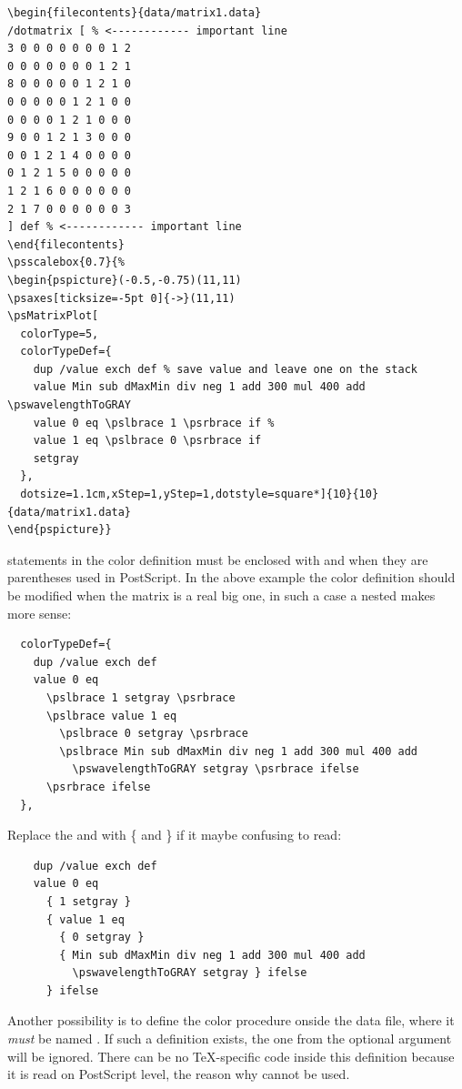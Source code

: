 \documentclass[11pt,english,BCOR=10mm,DIV=12,bibliography=totoc,parskip=false,headings=small,
    headinclude=false,footinclude=false,oneside]{pst-doc}
\begin{document}
\begin{lstlisting}
\begin{filecontents}{data/matrix1.data}
/dotmatrix [ % <------------ important line
3 0 0 0 0 0 0 0 1 2
0 0 0 0 0 0 0 1 2 1
8 0 0 0 0 0 1 2 1 0
0 0 0 0 0 1 2 1 0 0
0 0 0 0 1 2 1 0 0 0
9 0 0 1 2 1 3 0 0 0
0 0 1 2 1 4 0 0 0 0
0 1 2 1 5 0 0 0 0 0
1 2 1 6 0 0 0 0 0 0
2 1 7 0 0 0 0 0 0 3
] def % <------------ important line
\end{filecontents}
\psscalebox{0.7}{%
\begin{pspicture}(-0.5,-0.75)(11,11)
\psaxes[ticksize=-5pt 0]{->}(11,11)
\psMatrixPlot[
  colorType=5,
  colorTypeDef={
    dup /value exch def % save value and leave one on the stack
    value Min sub dMaxMin div neg 1 add 300 mul 400 add \pswavelengthToGRAY 
    value 0 eq \pslbrace 1 \psrbrace if % 
    value 1 eq \pslbrace 0 \psrbrace if  
    setgray 
  },
  dotsize=1.1cm,xStep=1,yStep=1,dotstyle=square*]{10}{10}{data/matrix1.data}
\end{pspicture}}
\end{lstlisting}


 statements in the color definition must be enclosed with  and 
when they are parentheses used in PostScript. In the above example the color definition should be
modified when the matrix is a real big one, in such a case a nested  makes more sense:

\begin{lstlisting}
  colorTypeDef={
    dup /value exch def 
    value 0 eq 
      \pslbrace 1 setgray \psrbrace
      \pslbrace value 1 eq 
        \pslbrace 0 setgray \psrbrace
        \pslbrace Min sub dMaxMin div neg 1 add 300 mul 400 add
          \pswavelengthToGRAY setgray \psrbrace ifelse
      \psrbrace ifelse 
  },
\end{lstlisting}

Replace the  and  with \{ and \} if it maybe confusing to read:

\begin{lstlisting}
    dup /value exch def 
    value 0 eq 
      { 1 setgray }
      { value 1 eq 
        { 0 setgray }
        { Min sub dMaxMin div neg 1 add 300 mul 400 add
          \pswavelengthToGRAY setgray } ifelse
      } ifelse 
\end{lstlisting}

Another possibility is to define the color procedure onside the data file, where
it \emph{must} be named . If such a definition exists, the one from
the optional argument  will be ignored. There can be no
\TeX-specific code inside this definition because it is read on PostScript level,
the reason why  cannot be used.
\end{document}
